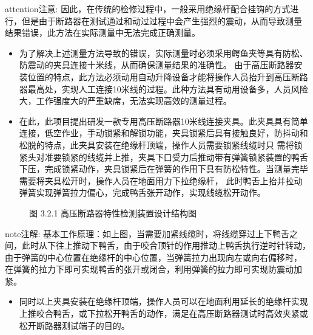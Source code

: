 \documentclass[a4paper,10pt,english]{sphinxmanual}
\begin{document}
\begin{sphinxadmonition}{attention}{注意:}
\sphinxAtStartPar
因此，在传统的检修过程中，一般采用绝缘杆配合挂钩的方式进行，但是由于断路器在测试通过和动过过程中会产生强烈的震动，从而导致测量
结果错误，此方法在实际测量中无法完成正确测量。
\end{sphinxadmonition}
\begin{itemize}
\item {} 
\sphinxAtStartPar
为了解决上述测量方法导致的错误，实际测量时必须采用鳄鱼夹等具有防松、防震动的夹具连接十米线，从而确保测量结果的准确性。
由于高压断路器安装位置的特点，此方法必须动用自动升降设备才能将操作人员抬升到高压断路器最高处，实现人工连接10米线的过程。此种方法具有动用设备多，人员风险大，工作强度大的严重缺席，无法实现高效的测量过程。

\item {} 
\sphinxAtStartPar
在此，此项目提出研发一款专用高压断路器10米线连接夹具。此夹具具有简单连接，低空作业，手动锁紧和解锁功能，夹具锁紧后具有接触良好，防抖动和松脱的特点，此夹具安装在绝缘杆顶端，操作人员需要锁紧线缆时只
需将锁紧头对准要锁紧的线缆并上推，夹具下口受力后推动带有弹簧锁紧装置的鸭舌下压，完成锁紧动作，夹具锁紧后在弹簧的作用下具有防松特性。当测量完毕需要将夹具松开时，操作人员在地面用力下拉绝缘杆，
此时鸭舌上抬并拉动弹簧实现弹簧拉力偏心，完成鸭舌张开动作，实现线缆松开动作。

\end{itemize}

\begin{figure}[htbp]
\centering
\capstart

\noindent{}
\caption{图 3.2.1 高压断路器特性检测装置设计结构图}\label{\detokenize{work_principle:id6}}\end{figure}

\begin{sphinxadmonition}{note}{注解:}
\sphinxAtStartPar
基本工作原理：如上图，当需要加紧线缆时，将线缆穿过上下鸭舌之间，此时从下往上推动下鸭舌，由于咬合顶针的作用推动上鸭舌执行逆时针转动，由于弹簧的中心位置在绝缘杆的中心位置，当弹簧拉力出现向左或向右偏移时，
在弹簧的拉力下即可实现鸭舌的张开或闭合，利用弹簧的拉力即可实现防震动加紧。
\end{sphinxadmonition}
\begin{itemize}
\item {} 
\sphinxAtStartPar
同时以上夹具安装在绝缘杆顶端，操作人员可以在地面利用延长的绝缘杆实现上推咬合鸭舌，或下拉松开鸭舌的动作，满足在高压断路器测试时高效夹紧或松开断路器测试端子的目的。

\end{itemize}
\end{document}
